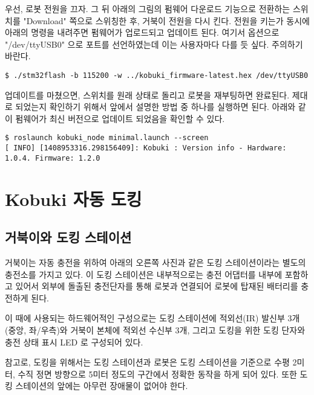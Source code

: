 우선, 로봇 전원을 끄자. 그 뒤 아래의 그림의 펌웨어 다운로드 기능으로 전환하는 스위치를 "Download" 쪽으로 스위칭한 후, 거북이 전원을 다시 킨다. 전원을 키는가 동시에 아래의 명령을 내려주면 펌웨어가 업로드되고 업데이트 된다. 여기서 옵션으로 "/dev/ttyUSB0" 으로 포트를 선언하였는데 이는 사용자마다 다를 듯 싶다. 주의하기 바란다.

\vspace{\baselineskip}
\begin{lstlisting}[language=ROS]
$ ./stm32flash -b 115200 -w ../kobuki_firmware-latest.hex /dev/ttyUSB0
\end{lstlisting}


업데이트를 마쳤으면, 스위치를 원래 상태로 돌리고 로봇을 재부팅하면 완료된다. 제대로 되었는지 확인하기 위해서 앞에서 설명한 방법 중 하나를 실행하면 된다. 아래와 같이 펌웨어가 최신 버전으로 업데이트 되었음을 확인할 수 있다.

\vspace{\baselineskip}
\begin{lstlisting}[language=ROS]
$ roslaunch kobuki_node minimal.launch --screen
[ INFO] [1408953316.298156409]: Kobuki : Version info - Hardware: 1.0.4. Firmware: 1.2.0
\end{lstlisting}

\section{Kobuki 자동 도킹}

\subsection{거북이와 도킹 스테이션}

거북이는 자동 충전을 위하여 아래의 오른쪽 사진과 같은 도킹 스테이션이라는 별도의 충전소를 가지고 있다. 이 도킹 스테이션은 내부적으로는 충전 어댑터를 내부에 포함하고 있어서 외부에 돌출된 충전단자를 통해 로봇과 연결되어 로봇에 탑재된 배터리를 충전하게 된다.

이 때에 사용되는 하드웨어적인 구성으로는 도킹 스테이션에 적외선(IR) 발신부 3개 (중앙, 좌/우측)와 거북이 본체에 적외선 수신부 3개, 그리고 도킹을 위한 도킹 단자와 충전 상태 표시 LED 로 구성되어 있다.

참고로, 도킹을 위해서는 도킹 스테이션과 로봇은 도킹 스테이션을 기준으로 수평 2미터, 수직 정면 방향으로 5미터 정도의 구간에서 정확한 동작을 하게 되어 있다. 또한 도킹 스테이션의 앞에는 아무런 장애물이 없어야 한다.

